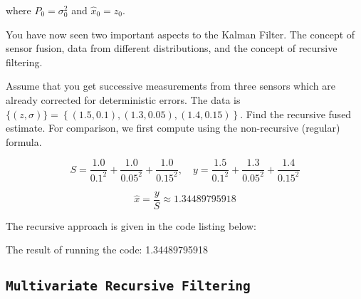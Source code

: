 where \(P_0 = \sigma_0^2\) and \(\hat{x}_0 = z_0\).

You have now seen two important aspects to the Kalman Filter. The
concept of sensor fusion, data from different distributions, and the
concept of recursive filtering.

Assume that you get successive measurements from three sensors which are
already corrected for deterministic errors. The data is
\(\{(z,\sigma)\} = \left\{ (1.5, 0.1), (1.3, 0.05), (1.4, 0.15)\right\}\).
Find the recursive fused estimate. For comparison, we first compute
using the non-recursive (regular) formula.

\[\displaystyle S = \frac{1.0}{0.1^2} + \frac{1.0}{0.05^2} + \frac{1.0}{0.15^2}, \quad
\displaystyle y = \frac{1.5}{0.1^2} + \frac{1.3}{0.05^2} + \frac{1.4}{0.15^2}\]

\[\hat{x}  = \frac{y}{S} \approx 1.34489795918\]

The recursive approach is given in the code listing below:

\begin{Shaded}
\begin{Highlighting}[]
\OperatorTok{=} \NormalTok{[}\OperatorTok{,}\OperatorTok{,}\NormalTok{]}
\OperatorTok{=} \NormalTok{[}\OperatorTok{,}\OperatorTok{,}\NormalTok{]}
\OperatorTok{=}\NormalTok{ sigma[}\NormalTok{]}\OperatorTok{\^{}}
\OperatorTok{=}\NormalTok{ z[}\NormalTok{]}

\OperatorTok{=} \OperatorTok{:}
\OperatorTok{=}\OperatorTok{/}\OperatorTok{+}\NormalTok{ sigma[i}\OperatorTok{+}\NormalTok{]}\OperatorTok{\^{}}\NormalTok{)}
\OperatorTok{=}\OperatorTok{+}\OperatorTok{*}\NormalTok{(z[i}\OperatorTok{+}\NormalTok{] }\OperatorTok{{-}}
\OperatorTok{=}\NormalTok{ (}\OperatorTok{{-}}\OperatorTok{*}
\end{Highlighting}
\end{Shaded}

The result of running the code: 1.34489795918

\hypertarget{multivariatesensorfusion}{%
\subsection{\texorpdfstring{\texttt{Multivariate\ Recursive\ Filtering}}{Multivariate Recursive Filtering}}\label{multivariatesensorfusion}}

